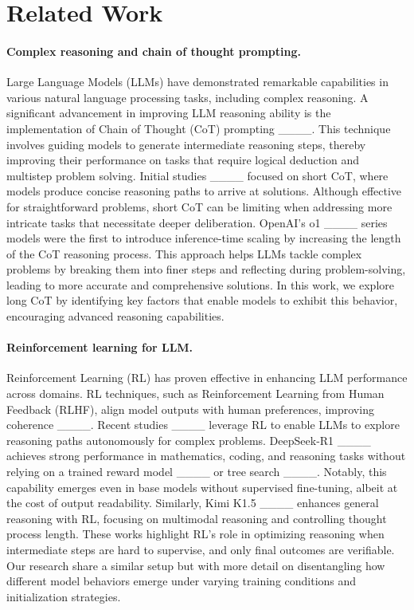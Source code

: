 \section{Related Work}
\paragraph{Complex reasoning and chain of thought prompting.} Large Language Models (LLMs) have demonstrated remarkable capabilities in various natural language processing tasks, including complex reasoning. A significant advancement in improving LLM reasoning ability is the implementation of Chain of Thought (CoT) prompting ____. This technique involves guiding models to generate intermediate reasoning steps, thereby improving their performance on tasks that require logical deduction and multistep problem solving. Initial studies ____ focused on short CoT, where models produce concise reasoning paths to arrive at solutions. Although effective for straightforward problems, short CoT can be limiting when addressing more intricate tasks that necessitate deeper deliberation. OpenAI’s o1 ____ series models were the first to introduce inference-time scaling by increasing the length of the CoT reasoning process. This approach helps LLMs tackle complex problems by breaking them into finer steps and reflecting during problem-solving, leading to more accurate and comprehensive solutions. In this work, we explore long CoT by identifying key factors that enable models to exhibit this behavior, encouraging advanced reasoning capabilities.

\paragraph{Reinforcement learning for LLM.} Reinforcement Learning (RL) has proven effective in enhancing LLM performance across domains. RL techniques, such as Reinforcement Learning from Human Feedback (RLHF), align model outputs with human preferences, improving coherence ____. Recent studies ____ leverage RL to enable LLMs to explore reasoning paths autonomously for complex problems. DeepSeek-R1 ____ achieves strong performance in mathematics, coding, and reasoning tasks without relying on a trained reward model ____ or tree search ____. Notably, this capability emerges even in base models without supervised fine-tuning, albeit at the cost of output readability. Similarly, Kimi K1.5 ____ enhances general reasoning with RL, focusing on multimodal reasoning and controlling thought process length. These works highlight RL’s role in optimizing reasoning when intermediate steps are hard to supervise, and only final outcomes are verifiable. Our research share a similar setup but with more detail on disentangling how different model behaviors emerge under varying training conditions and initialization strategies.